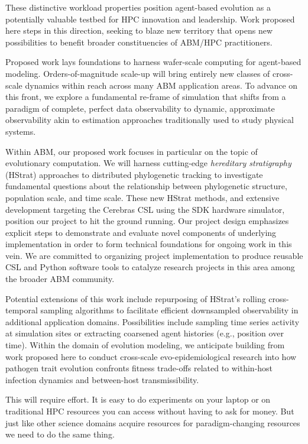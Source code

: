 These distinctive workload properties position agent-based evolution as a potentially valuable testbed for HPC innovation and leadership.
Work proposed here steps in this direction, seeking to blaze new territory that opens new possibilities to benefit broader constituencies of ABM/HPC practitioners.


Proposed work lays foundations to harness wafer-scale computing for agent-based modeling.
Orders-of-magnitude scale-up will bring entirely new classes of cross-scale dynamics within reach across many ABM application areas.
To advance on this front, we explore a fundamental re-frame of simulation that shifts from a paradigm of complete, perfect data observability to dynamic, approximate observability akin to estimation approaches traditionally used to study physical systems.

Within ABM, our proposed work focuses in particular on the topic of evolutionary computation.
We will harness cutting-edge \textit{hereditary stratigraphy} (HStrat) approaches to distributed phylogenetic tracking to investigate fundamental questions about the relationship between phylogenetic structure, population scale, and time scale.
These new HStrat methods, and extensive development targeting the Cerebras CSL using the SDK hardware simulator, position our project to hit the ground running.
Our project design emphasizes explicit steps to demonstrate and evaluate novel components of underlying implementation in order to form technical foundations for ongoing work in this vein.
We are committed to organizing project implementation to produce reusable CSL and Python software tools to catalyze research projects in this area among the broader ABM community.

Potential extensions of this work include repurposing of HStrat's rolling cross-temporal sampling algorithms to facilitate efficient downsampled observability in additional application domains.
Possibilities include sampling time series activity at simulation sites or extracting coarsened agent histories (e.g., position over time).
Within the domain of evolution modeling, we anticipate building from work proposed here to conduct cross-scale evo-epidemiological research into how pathogen trait evolution confronts fitness trade-offs related to within-host infection dynamics and between-host transmissibility.

This will require effort.
It is easy to do experiments on your laptop or on traditional HPC resources you can access without having to ask for money.
But just like other science domains acquire resources for paradigm-changing resources we need to do the same thing.
